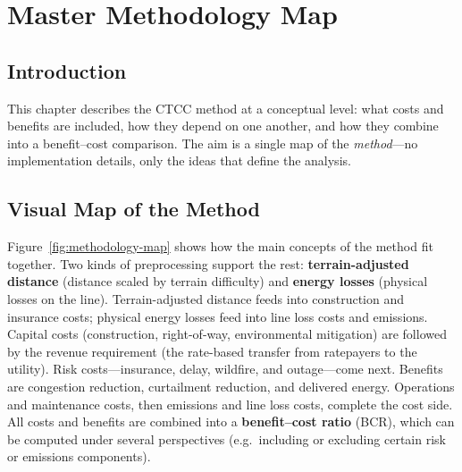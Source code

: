 \documentclass[ctcc_full_documentation.tex]{subfiles}
\begin{document}
\chapter{Master Methodology Map}

\section{Introduction}

This chapter describes the CTCC method at a conceptual level: what costs and benefits are included, how they depend on one another, and how they combine into a benefit--cost comparison. The aim is a single map of the \emph{method}---no implementation details, only the ideas that define the analysis.

\section{Visual Map of the Method}

Figure~\ref{fig:methodology-map} shows how the main concepts of the method fit together. Two kinds of preprocessing support the rest: \textbf{terrain-adjusted distance} (distance scaled by terrain difficulty) and \textbf{energy losses} (physical losses on the line). Terrain-adjusted distance feeds into construction and insurance costs; physical energy losses feed into line loss costs and emissions. Capital costs (construction, right-of-way, environmental mitigation) are followed by the revenue requirement (the rate-based transfer from ratepayers to the utility). Risk costs---insurance, delay, wildfire, and outage---come next. Benefits are congestion reduction, curtailment reduction, and delivered energy. Operations and maintenance costs, then emissions and line loss costs, complete the cost side. All costs and benefits are combined into a \textbf{benefit--cost ratio} (BCR), which can be computed under several perspectives (e.g.\ including or excluding certain risk or emissions components).
\end{document}
